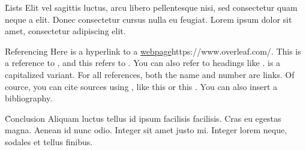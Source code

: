\documentclass{thesis}
\begin{document}
\h{Lists}
Elit vel sagittis luctus, arcu libero pellentesque nisi, sed consectetur quam neque a elit. Donec consectetur cursus nulla eu feugiat. Lorem ipsum dolor sit amet, consectetur adipiscing elit.


\h{Referencing}
Here is a hyperlink to a \url{webpage}{https://www.overleaf.com/}. This is a reference to , and this refers to . You can also refer to headings like .  is a capitalized variant. For all references, both the name and number are links. Of cource, you can cite sources using \c{\cite{...}}, like this \cite{minted} or this \cite{tabularray}. You can also insert a bibliography.

\h{Conclusion}
Aliquam luctus tellus id ipsum facilisis facilisis. Cras eu egestas magna. Aenean id nunc odio. Integer sit amet justo mi. Integer lorem neque, sodales et tellus finibus.

\toc

\end{document}

